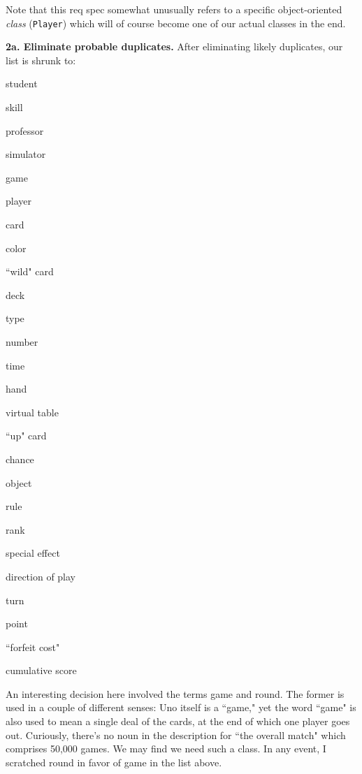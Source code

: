 Note that this req spec somewhat unusually refers to a specific
object-oriented \textit{class} (\texttt{Player}) which will of course become
one of our actual classes in the end.

\vspace{.1in}
\textbf{2a. Eliminate probable duplicates.} After eliminating likely
duplicates, our list is shrunk to:

\begin{samepage}
\begin{multicols}{3}
\small
\begin{compactitem}
\renewcommand\labelitemi{\raisebox{0.25ex}{\tiny$\bullet$}}
\item \textsf{student}
\item \textsf{skill}
\item \textsf{professor}
\item \textsf{simulator}
\item \textsf{game}
\item \textsf{player}
\item \textsf{card}
\item \textsf{color}
\item \textsf{``wild" card}
\columnbreak
\item \textsf{deck}
\item \textsf{type}
\item \textsf{number}
\item \textsf{time}
\item \textsf{hand}
\item \textsf{virtual table}
\item \textsf{``up" card}
\item \textsf{chance}
\item \textsf{object}
\columnbreak
\item \textsf{rule}
\item \textsf{rank}
\item \textsf{special effect}
\item \textsf{direction of play}
\item \textsf{turn}
\item \textsf{point}
\item \textsf{``forfeit cost"}
\item \textsf{cumulative score}
\end{compactitem}
\end{multicols}
\end{samepage}

An interesting decision here involved the terms \textsf{game} and
\textsf{round}. The former is used in a couple of different senses: Uno itself
is a ``game," yet the word ``game" is also used to mean a single deal of the
cards, at the end of which one player goes out. Curiously, there's no noun in
the description for ``the overall match" which comprises 50,000 games. We may
find we need such a class. In any event, I scratched \textsf{round} in favor
of \textsf{game} in the list above.

